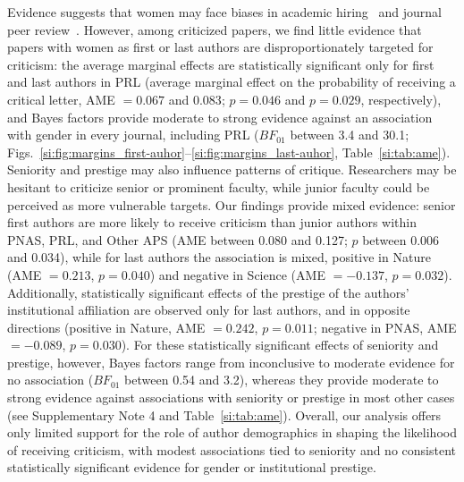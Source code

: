 \documentclass[12pt,a4paper]{article}
\numberwithin{equation}{section}
\begin{document}
Evidence suggests that women may face biases in academic hiring~\cite{moss-racusin_2012_bias} and journal peer review~\cite{fox_2019_gender, hengel_2022_female}.
However, among criticized papers, we find little evidence that papers with women as first or last authors are disproportionately targeted for criticism: the average marginal effects are statistically significant only for first and last authors in PRL (average marginal effect on the probability of receiving a critical letter, AME $= 0.067$ and $0.083$; $p = 0.046$ and $p = 0.029$, respectively), and Bayes factors provide moderate to strong evidence against an association with gender in every journal, including PRL ($BF_{01}$ between 3.4 and 30.1; Figs.~\ref*{si:fig:margins_first-auhor}--\ref*{si:fig:margins_last-auhor}, Table~\ref*{si:tab:ame}).
Seniority and prestige may also influence patterns of critique. 
Researchers may be hesitant to criticize senior or prominent faculty, while junior faculty could be perceived as more vulnerable targets.
Our findings provide mixed evidence: senior first authors are more likely to receive criticism than junior authors within PNAS, PRL, and Other APS (AME between 0.080 and 0.127; $p$ between 0.006 and 0.034), while for last authors the association is mixed, positive in Nature (AME $= 0.213$, $p = 0.040$) and negative in Science (AME $= -0.137$, $p = 0.032$). 
Additionally, statistically significant effects of the prestige of the authors’ institutional affiliation are observed only for last authors, and in opposite directions (positive in Nature, AME $= 0.242$, $p = 0.011$; negative in PNAS, AME $= -0.089$, $p = 0.030$).
For these statistically significant effects of seniority and prestige, however, Bayes factors range from inconclusive to moderate evidence for no association ($BF_{01}$ between 0.54 and 3.2), whereas they provide moderate to strong evidence against associations with seniority or prestige in most other cases (see Supplementary Note 4 and Table~\ref*{si:tab:ame}).
Overall, our analysis offers only limited support for the role of author demographics in shaping the likelihood of receiving criticism, with modest associations tied to seniority and no consistent statistically significant evidence for gender or institutional prestige.
\end{document}
